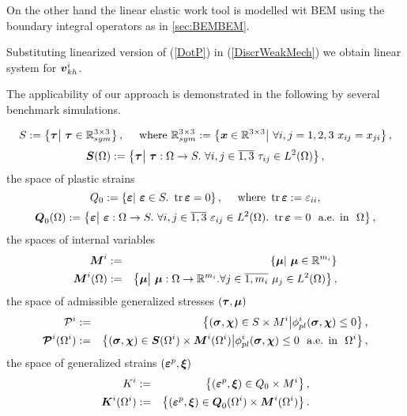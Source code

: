 \documentclass[12pt,a4paper]{scrbook}
\begin{document}
On the other hand the linear elastic work tool is modelled wit BEM using the  boundary integral operators as in \ref{sec:BEMBEM}.

Substituting linearized version of  (\ref{DotP}) in (\ref{DiscrWeakMech}) we obtain linear system for $\mbox{\boldmath$v$}^{i}_{kh}$.


The applicability of our approach is demonstrated in the following by several benchmark simulations.


\newpage
\begin{equation}
S:=\left\{\mbox{\boldmath$\tau$}\middle|~\mbox{\boldmath$\tau$}\in {\mathbb R}^{3\times 3}_{sym}\right\},\quad \mbox{ where } {\mathbb R}^{3\times 3}_{sym}:=\left\lbrace \mbox{\boldmath$x$}\in {\mathbb R}^{3\times 3}\middle|~ \forall i,j=1,2,3~x_{ij}=x_{ji}\right\rbrace,
\end{equation}
\begin{equation}
\mbox{\boldmath$S$}(\Omega):=\left\{\mbox{\boldmath$\tau$}\middle|~\mbox{\boldmath$\tau$}:\Omega\rightarrow S.~\forall i,j\in \overline{1,3}~ \tau_{ij}\in L^{2}(\Omega) \right\},
\end{equation}
the space of plastic strains
\begin{equation}
Q_0:=\left\{\mbox{\boldmath$\varepsilon$}\middle|~\mbox{\boldmath$\varepsilon$}\in S.~ \mathop{\rm tr}\nolimits \mbox{\boldmath$\varepsilon$} = 0\right\},\quad \mbox{ where } \mathop{\rm tr}\nolimits \mbox{\boldmath$\varepsilon$} :=\varepsilon_{ii},
\end{equation}
\begin{equation}
\mbox{\boldmath$Q$}_0(\Omega):=\left\{\mbox{\boldmath$\varepsilon$}\middle|~\mbox{\boldmath$\varepsilon$}:\Omega\rightarrow S.~\forall i,j\in \overline{1,3}~ \varepsilon_{ij}\in L^{2}(\Omega). ~ \mathop{\rm tr}\nolimits \mbox{\boldmath$\varepsilon$} = 0~\text{ a.e. in }~\Omega \right\},
\end{equation}
the spaces of internal variables
\begin{eqnarray}
\mbox{\boldmath$M$}^{i}&:=&\left\{\mbox{\boldmath$\mu$}\middle|~\mbox{\boldmath$\mu$}\in {\mathbb R}^{m_i}\right\} \\
\mbox{\boldmath$M$}^{i}(\Omega)&:=&\left\{\mbox{\boldmath$\mu$}\middle|~\mbox{\boldmath$\mu$}:\Omega\rightarrow {\mathbb R}^{m_i}. \forall j \in \overline{1,m_i} ~ \mu_j\in L^{2}(\Omega) \right\},
\end{eqnarray}
the space of admissible generalized stresses $(\mbox{\boldmath$\tau$},\mbox{\boldmath$\mu$})$
\begin{eqnarray}
\mathcal{P}^{i}&:=&\left\lbrace (\mbox{\boldmath$\sigma$},\mbox{\boldmath$\chi$})\in S\times M^{i} \middle| \phi_{pl}^{i}(\mbox{\boldmath$\sigma$},\mbox{\boldmath$\chi$})\leq 0 \right\rbrace, \\
\mbox{\boldmath$\mathcal{P}$}^{i}(\Omega^{i})&:=&\left\lbrace (\mbox{\boldmath$\sigma$},\mbox{\boldmath$\chi$})\in \mbox{\boldmath$S$}(\Omega^i)\times \mbox{\boldmath$M$}^{i}(\Omega^i)\middle|\phi_{pl}^{i}(\mbox{\boldmath$\sigma$},\mbox{\boldmath$\chi$})\leq 0 ~\text{ a.e. in }~\Omega^i\right\rbrace,
\end{eqnarray}
the space of generalized strains $(\mbox{\boldmath$\varepsilon$}^{p},\mbox{\boldmath$\xi$})$
\begin{eqnarray}
K^{i}&:=&\left\lbrace (\mbox{\boldmath$\varepsilon$}^{p},\mbox{\boldmath$\xi$})\in Q_0\times M^{i} \right\rbrace, \\
\mbox{\boldmath$K$}^{i}(\Omega^{i})&:=&\left\lbrace (\mbox{\boldmath$\varepsilon$}^{p},\mbox{\boldmath$\xi$})\in \mbox{\boldmath$Q$}_0(\Omega^i)\times \mbox{\boldmath$M$}^{i}(\Omega^i)\right\rbrace.
\end{eqnarray}
\end{document}
